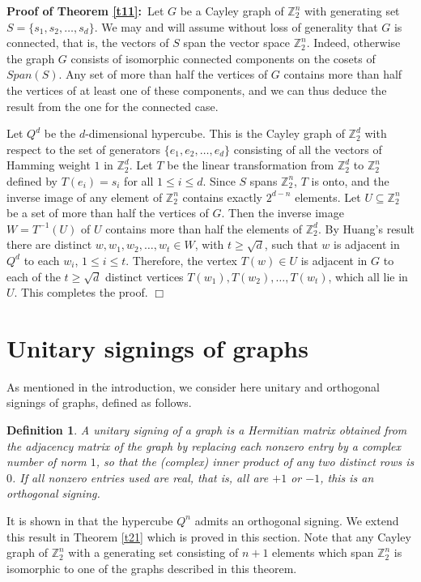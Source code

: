 \documentclass[11pt]{article}
\newtheorem{definition}{Definition}[section]
\begin{document}
\noindent
{\bf Proof of Theorem \ref{t11}:}\,
Let $G$ be a Cayley graph of ${\mathbb{Z}_{2}^{n}}$ with generating set $S=\{s_1,s_2,
\ldots ,s_d\}$. We may and will 
assume without loss of generality that $G$ is connected, that is,
the vectors of
$S$ span the vector space ${\mathbb{Z}_{2}^{n}}$. 
Indeed, otherwise the graph $G$ consists of
isomorphic connected components on the cosets of $Span(S)$. Any set of
more than half the vertices of $G$ contains more than half the vertices
of at least one of these components, and we can thus deduce the result
from the one for the connected case.

Let $Q^d$ be the $d$-dimensional
hypercube. This is the Cayley graph of ${\mathbb{Z}_{2}^{d}}$ with respect to the
set of generators $\{e_1,e_2, \ldots ,e_d\}$ consisting of all the
vectors of Hamming weight $1$ in ${\mathbb{Z}_{2}^{d}}$. Let $T$ be the linear
transformation from ${\mathbb{Z}_{2}^{d}}$ to ${\mathbb{Z}_{2}^{n}}$ defined by $T(e_i)=s_i$
for all $1 \leq i \leq d$. Since $S$ spans ${\mathbb{Z}_{2}^{n}}$, $T$ is onto, and the
inverse image of any element of ${\mathbb{Z}_{2}^{n}}$ contains exactly
$2^{d-n}$ elements. Let $U \subseteq {\mathbb{Z}_{2}^{n}}$ be a set of more than 
half the vertices of $G$. Then the inverse image $W=T^{-1}(U)$
of $U$ contains more than half the elements of ${\mathbb{Z}_{2}^{d}}$. 
By Huang's result there are distinct $w, w_1,w_2, \ldots ,w_t
\in W$, with $t \geq \sqrt d$, such that $w$ is adjacent 
in $Q^d$ to each $w_i$, $1 \leq i \leq t$. Therefore, the vertex
$T(w) \in U$ is adjacent in $G$ to each of the $t \geq \sqrt d$ 
distinct vertices $T(w_1), T(w_2), \ldots ,T(w_t)$, which all lie in
$U$. This completes the proof. \hfill $\Box$

\section{Unitary signings of graphs} \label{sec: unitary signings}

As mentioned in the introduction, we consider here
unitary and orthogonal signings of graphs, defined as follows.
\begin{definition}
A {\em unitary signing}
of a graph is a Hermitian matrix obtained from the 
adjacency matrix of the graph by replacing each nonzero entry by
a complex number of norm $1$, so that the (complex) inner product of
any two distinct rows is $0$. If all nonzero entries used are real,
that is, all are $+1$ or $-1$, this is an {\em orthogonal signing}.
\end{definition}
It is shown in \cite{Hu} that the hypercube $Q^n$ admits an orthogonal
signing. We extend this result in Theorem \ref{t21} which is proved
in this section.
Note that any Cayley graph of ${\mathbb{Z}_{2}^{n}}$ with a generating set consisting
of $n+1$ elements which span ${\mathbb{Z}_{2}^{n}}$ is isomorphic to one of the
graphs described in this theorem.
\end{document}

